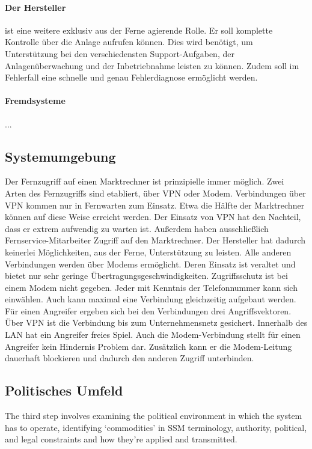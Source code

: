 \documentclass[11pt,a4paper]{report}
\begin{document}
\paragraph{Der Hersteller} ist eine weitere exklusiv aus der Ferne agierende Rolle. Er soll komplette Kontrolle über die Anlage aufrufen können. Dies wird benötigt, um Unterstützung bei den verschiedensten Support-Aufgaben, der Anlagenüberwachung und der Inbetriebnahme leisten zu können. Zudem soll im Fehlerfall eine schnelle und genau Fehlerdiagnose ermöglicht werden. 
\paragraph{Fremdsysteme} ...


\subsection{Systemumgebung}

Der Fernzugriff auf einen Marktrechner ist prinzipielle immer möglich. Zwei Arten des Fernzugriffs sind etabliert, über VPN oder Modem. Verbindungen über VPN kommen nur in Fernwarten zum Einsatz. Etwa die Hälfte der Marktrechner können auf diese Weise erreicht werden. Der Einsatz von VPN hat den Nachteil, dass er extrem aufwendig zu warten ist. Außerdem haben ausschließlich Fernservice-Mitarbeiter Zugriff auf den Marktrechner. Der Hersteller hat dadurch keinerlei Möglichkeiten, aus der Ferne, Unterstützung zu leisten. Alle anderen Verbindungen werden über Modems ermöglicht. Deren Einsatz ist veraltet und bietet nur sehr geringe Übertragungsgeschwindigkeiten. Zugriffsschutz ist bei einem Modem nicht gegeben. Jeder mit Kenntnis der Telefonnummer kann sich einwählen. Auch kann maximal eine Verbindung gleichzeitig aufgebaut werden. Für einen Angreifer ergeben sich bei den Verbindungen drei Angriffsvektoren. Über VPN ist die Verbindung bis zum Unternehmensnetz gesichert. Innerhalb des LAN hat ein Angreifer freies Spiel. Auch die Modem-Verbindung stellt für einen Angreifer kein Hindernis Problem dar. Zusätzlich kann er die Modem-Leitung dauerhaft blockieren und dadurch den anderen Zugriff unterbinden.

\subsection{Politisches Umfeld}

The third step involves examining the political environment in which the system has
to operate, identifying ‘commodities’ in SSM terminology, authority, political, and
legal constraints and how they’re applied and transmitted.
\end{document}
